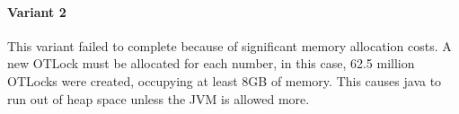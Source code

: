 \documentclass[11pt]{article}
\begin{document}
\paragraph{Variant 2} This variant failed to complete because of significant memory allocation costs. A new OTLock must be allocated for each number, in this case, 62.5 million OTLocks were created, occupying at least 8GB of memory. This causes java to run out of heap space unless the JVM is allowed more.
\end{document}
